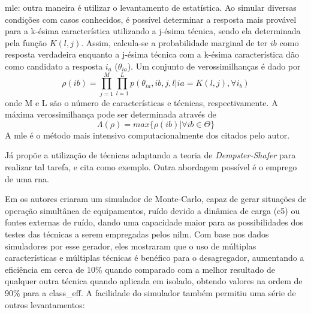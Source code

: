 \begin{enumerate}[label=\textbf{2.\arabic*},wide=\parindent]
\begin{description}
\item \gls{mle}: outra maneira é utilizar o levantamento de
estatística. Ao simular diversas condições com casos conhecidos, é
possível determinar a resposta mais provável para a k-ésima
característica utilizando a j-ésima técnica, sendo ela
determinada pela função $K(l,j)$. Assim, calcula-se a probabilidade
marginal de ter $ib$ como resposta verdadeira enquanto a j-ésima
técnica com a k-ésima característica dão como candidato a resposta
$i_a$ ($\theta_{ia}$). Um conjunto de verossimilhanças é dado por
\begin{equation}
\rho(ib) = \prod_{j=1}^M\prod_{l=1}^L
p(\theta_{ia},ib,j,l|ia=K(l,j),\forall i_b)
\end{equation}
onde M e L são o número de características e técnicas,
respectivamente. A máxima verossimilhança pode ser determinada através de 
\begin{equation}
\Lambda(\rho)=max\{\rho(ib)|\forall ib\in\Theta\}
\end{equation}
A \gls{mle} é o método mais intensivo computacionalmente dos citados
pelo autor.
\end{description}

Já \cite{nilm_zeifman_review_2011} propõe a utilização de
técnicas adaptando a teoria de \emph{Dempster-Shafer} para realizar
tal tarefa, e cita \cite{information_fusion_basir_2007_40} como
exemplo. Outra abordagem possível é o emprego de uma \gls{rna}.

Em \cite{nilm_liang_pt2_2010_40} os autores criaram um simulador de
Monte-Carlo, capaz de gerar situações de operação simultânea de equipamentos,
ruído devido a dinâmica de carga (\gls{c5}) ou fontes externas de
ruído, dando uma capacidade maior para as possibilidades dos
testes das técnicas a serem empregadas pelos \gls{nilm}. Com base nos
dados simuladores por esse gerador, eles mostraram que o uso de
múltiplas características e múltiplas técnicas é benéfico para o
desagregador, aumentando a eficiência em cerca de 10\% quando
comparado com a melhor resultado de qualquer outra técnica quando
aplicada em isolado, obtendo valores na ordem de 90\% para a
\acs{class_eff}. A facilidade do simulador também permitiu uma
série de outros levantamentos:


\end{enumerate}

